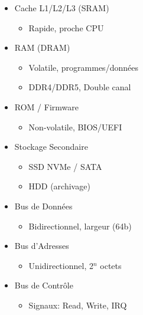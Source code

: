 \documentclass[11pt]{article}
\begin{document}
\begin{popfigure}
\begin{tcbraster}[raster columns=2,raster equal height=rows,raster column skip=6pt,raster row skip=6pt,enhanced,blankest]
\begin{tcolorbox}
\begin{itemize}[nosep,leftmargin=*,itemsep=1pt,font=\scriptsize]
\item Cache L1/L2/L3 (SRAM)
\begin{itemize}[nosep,leftmargin=1.1em,itemsep=0pt]
\item Rapide, proche CPU
\end{itemize}
\item RAM (DRAM)
\begin{itemize}[nosep,leftmargin=1.1em,itemsep=0pt]
\item Volatile, programmes/données
\item DDR4/DDR5, Double canal
\end{itemize}
\item ROM / Firmware
\begin{itemize}[nosep,leftmargin=1.1em,itemsep=0pt]
\item Non-volatile, BIOS/UEFI
\end{itemize}
\item Stockage Secondaire
\begin{itemize}[nosep,leftmargin=1.1em,itemsep=0pt]
\item SSD NVMe / SATA
\item HDD (archivage)
\end{itemize}
\end{itemize}
\end{tcolorbox}
\begin{tcolorbox}[enhanced,colback=white,colframe=poppurple,boxrule=0.9pt,arc=3pt,title={Bus Système},fonttitle=\bfseries\scriptsize,coltitle=white,colbacktitle=poppurple,left=4pt,right=4pt,top=2pt,bottom=2pt,boxsep=1pt,toptitle=1.5pt,bottomtitle=1.5pt,halign=left]
\begin{itemize}[nosep,leftmargin=*,itemsep=1pt,font=\scriptsize]
\item Bus de Données
\begin{itemize}[nosep,leftmargin=1.1em,itemsep=0pt]
\item Bidirectionnel, largeur (64b)
\end{itemize}
\item Bus d'Adresses
\begin{itemize}[nosep,leftmargin=1.1em,itemsep=0pt]
\item Unidirectionnel, 2$^n$ octets
\end{itemize}
\item Bus de Contrôle
\begin{itemize}[nosep,leftmargin=1.1em,itemsep=0pt]
\item Signaux: Read, Write, IRQ

\end{itemize}
\end{itemize}
\end{tcolorbox}
\end{tcbraster}
\end{popfigure}
\end{document}

